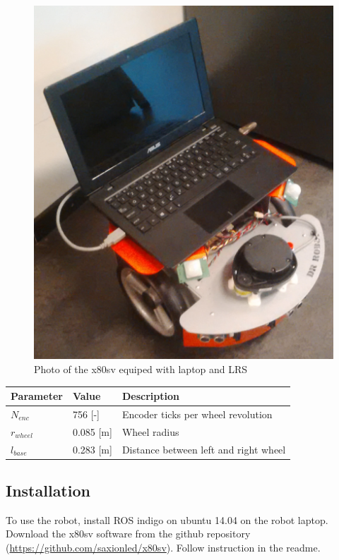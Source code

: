 \documentclass[a4paper]{article}
\begin{document}
\begin{figure}[h!]
  \centering
  \includegraphics[width=\textwidth,height=\textheight,keepaspectratio]{img/fotorobot.png}
  \caption{Photo of the x80sv equiped with laptop and LRS}
\end{figure}

\begin{tabular}{ | l | l | l |}
  \hline                       
  Parameter & Value & Description\\
  \hline 
  \hline 
  $N_{enc}$ & 756 [-] & Encoder ticks per wheel revolution \\
  \hline
  $r_{wheel}$ & 0.085 [m] & Wheel radius\\
  \hline
  $l_{base}$ & 0.283 [m] & Distance between left and right wheel\\
  \hline
\end{tabular}

\subsection{Installation}

To use the robot, install ROS indigo on ubuntu 14.04 on the robot laptop. Download the 
x80sv software from the github repository (\url{https://github.com/saxionled/x80sv}). Follow 
instruction in the readme.
\end{document}

